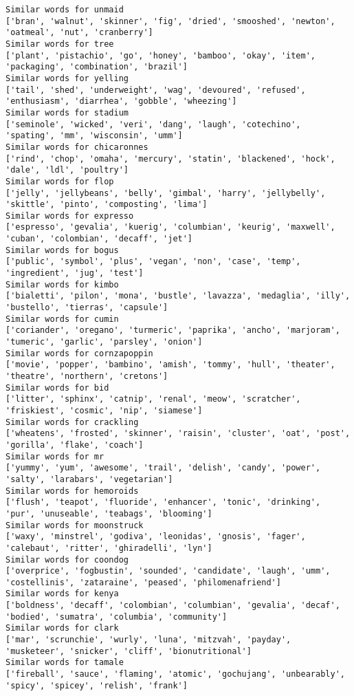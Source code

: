 \documentclass[11pt]{article}
\begin{document}
\begin{Verbatim}[commandchars=\\\{\}]
Similar words for unmaid
['bran', 'walnut', 'skinner', 'fig', 'dried', 'smooshed', 'newton', 'oatmeal', 'nut', 'cranberry']
Similar words for tree
['plant', 'pistachio', 'go', 'honey', 'bamboo', 'okay', 'item', 'packaging', 'combination', 'brazil']
Similar words for yelling
['tail', 'shed', 'underweight', 'wag', 'devoured', 'refused', 'enthusiasm', 'diarrhea', 'gobble', 'wheezing']
Similar words for stadium
['seminole', 'wicked', 'veri', 'dang', 'laugh', 'cotechino', 'spating', 'mm', 'wisconsin', 'umm']
Similar words for chicaronnes
['rind', 'chop', 'omaha', 'mercury', 'statin', 'blackened', 'hock', 'dale', 'ldl', 'poultry']
Similar words for flop
['jelly', 'jellybeans', 'belly', 'gimbal', 'harry', 'jellybelly', 'skittle', 'pinto', 'composting', 'lima']
Similar words for expresso
['espresso', 'gevalia', 'kuerig', 'columbian', 'keurig', 'maxwell', 'cuban', 'colombian', 'decaff', 'jet']
Similar words for bogus
['public', 'symbol', 'plus', 'vegan', 'non', 'case', 'temp', 'ingredient', 'jug', 'test']
Similar words for kimbo
['bialetti', 'pilon', 'mona', 'bustle', 'lavazza', 'medaglia', 'illy', 'bustello', 'tierras', 'capsule']
Similar words for cumin
['coriander', 'oregano', 'turmeric', 'paprika', 'ancho', 'marjoram', 'tumeric', 'garlic', 'parsley', 'onion']
Similar words for cornzapoppin
['movie', 'popper', 'bambino', 'amish', 'tommy', 'hull', 'theater', 'theatre', 'northern', 'cretons']
Similar words for bid
['litter', 'sphinx', 'catnip', 'renal', 'meow', 'scratcher', 'friskiest', 'cosmic', 'nip', 'siamese']
Similar words for crackling
['wheatens', 'frosted', 'skinner', 'raisin', 'cluster', 'oat', 'post', 'gorilla', 'flake', 'coach']
Similar words for mr
['yummy', 'yum', 'awesome', 'trail', 'delish', 'candy', 'power', 'salty', 'larabars', 'vegetarian']
Similar words for hemoroids
['flush', 'teapot', 'fluoride', 'enhancer', 'tonic', 'drinking', 'pur', 'unuseable', 'teabags', 'blooming']
Similar words for moonstruck
['waxy', 'minstrel', 'godiva', 'leonidas', 'gnosis', 'fager', 'calebaut', 'ritter', 'ghiradelli', 'lyn']
Similar words for coondog
['overprice', 'fogbustin', 'sounded', 'candidate', 'laugh', 'umm', 'costellinis', 'zataraine', 'peased', 'philomenafriend']
Similar words for kenya
['boldness', 'decaff', 'colombian', 'columbian', 'gevalia', 'decaf', 'bodied', 'sumatra', 'columbia', 'community']
Similar words for clark
['mar', 'scrunchie', 'wurly', 'luna', 'mitzvah', 'payday', 'musketeer', 'snicker', 'cliff', 'bionutritional']
Similar words for tamale
['fireball', 'sauce', 'flaming', 'atomic', 'gochujang', 'unbearably', 'spicy', 'spicey', 'relish', 'frank']

\end{Verbatim}
\end{document}
